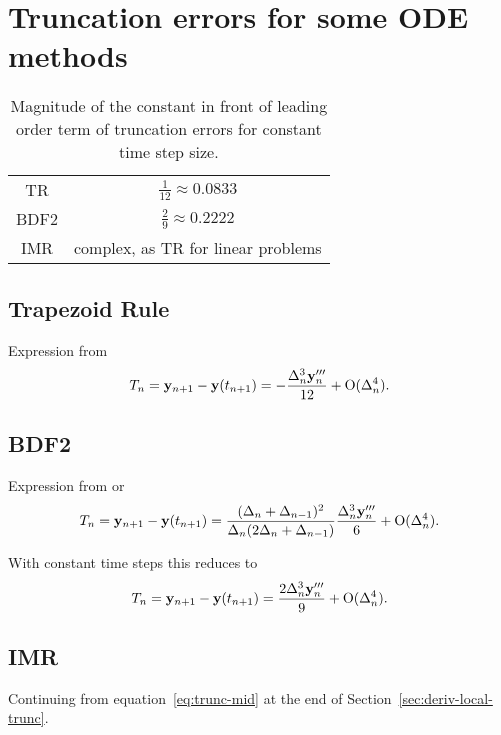 \chapter{Truncation errors for some ODE methods}

\begin{table}[h]
  \centering
  \begin{tabular}{c|c}
    TR & $\frac{1}{12} \approx 0.0833$ \\
    BDF2 & $\frac{2}{9} \approx 0.2222$ \\
    IMR & complex, as TR for linear problems
  \end{tabular}
  \caption{Magnitude of the constant in front of leading order term of truncation errors for constant time step size.}
  \label{tab:truncation-errors}
\end{table}

\section{Trapezoid Rule}

Expression from \cite[pg. 261]{GreshoSani}
\begin{equation}
  \label{eq:tr-lte-conststep}
  T_n = \mathbf{y}_{n+1} - \mathbf{y}(t_{n+1}) = -\frac{\Delta_{n}^3 \mathbf{y}_n'''}{12}
  + \text{O}(\Delta_{n}^4).
\end{equation}

\section{BDF2}

Expression from \cite[pg. 715]{GreshoSani} or \cite[eq. (2.43)]{Prinja2010}
\begin{equation}
  \label{eq:bdf2-lte}
  T_n = \mathbf{y}_{n+1} - \mathbf{y}(t_{n+1}) = \frac{(\Delta_{n} + \Delta_{n-1})^2}{\Delta_{n}(2\Delta_{n} + \Delta_{n-1})}
  \frac{\Delta_{n}^3 \mathbf{y}_n'''}{6}
  + \text{O}(\Delta_{n}^4).
\end{equation}

With constant time steps this reduces to
\begin{equation}
  \label{eq:bdf2-lte}
  T_n = \mathbf{y}_{n+1} - \mathbf{y}(t_{n+1}) =  \frac{2\Delta_{n}^3 \mathbf{y}_n'''}{9}
  + \text{O}(\Delta_{n}^4).
\end{equation}

\section{IMR}
\label{sec:full-imr-lte-calculation}

Continuing from equation~\eqref{eq:trunc-mid} at the end of Section~\ref{sec:deriv-local-trunc}.


